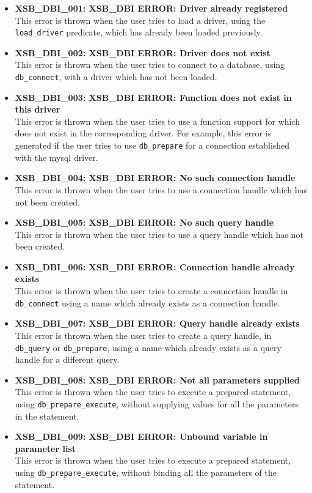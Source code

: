 \begin{itemize}

\item {\bf XSB\_DBI\_001: XSB\_DBI ERROR: Driver already registered}\\
This error is thrown when the user tries to load a driver, using the {\tt load\_driver} 
predicate, which has already been loaded previously.

\item {\bf XSB\_DBI\_002: XSB\_DBI ERROR: Driver does not exist}\\
This error is thrown when the user tries to connect to a database, using
{\tt db\_connect}, with a driver which has not been loaded.

\item {\bf XSB\_DBI\_003: XSB\_DBI ERROR: Function does not exist in this driver}\\
This error is thrown when the user tries to use a function support 
for which does not exist in the corresponding driver. For example, 
this error is generated if the user
tries to use {\tt db\_prepare} for a connection established with the
mysql driver.

\item {\bf XSB\_DBI\_004: XSB\_DBI ERROR: No such connection handle}\\
This error is thrown when the user tries to use a connection handle
which has not been created.

\item {\bf XSB\_DBI\_005: XSB\_DBI ERROR: No such query handle}\\
This error is thrown when the user tries to use a query handle which has 
not been created.

\item {\bf XSB\_DBI\_006: XSB\_DBI ERROR: Connection handle already exists}\\
This error is thrown when the user tries to create a connection handle in
{\tt db\_connect} using a name which already exists as a connection handle.

\item {\bf XSB\_DBI\_007: XSB\_DBI ERROR: Query handle already exists}\\
This error is thrown when the user tries to create a query handle, in
{\tt db\_query} or {\tt db\_prepare}, using a name which already exists as
a query handle for a different query.

\item {\bf XSB\_DBI\_008: XSB\_DBI ERROR: Not all parameters supplied}\\
This error is thrown when the user tries to execute a prepared statement,
using {\tt db\_prepare\_execute}, without supplying values for all the
parameters in the statement.

\item {\bf XSB\_DBI\_009: XSB\_DBI ERROR: Unbound variable in parameter list}\\
This error is thrown when the user tries to execute a prepared statement,
using {\tt db\_prepare\_execute}, without binding all the parameters of the
statement.

\end{itemize}

